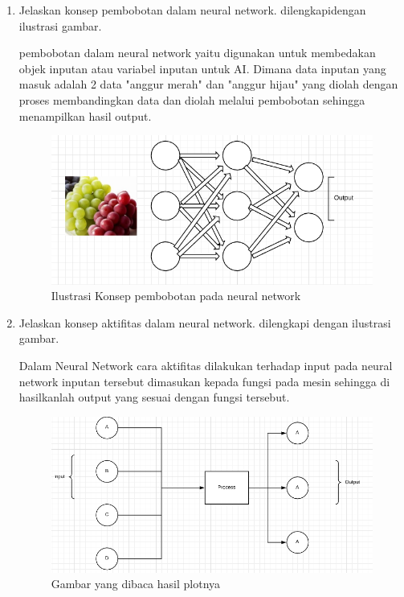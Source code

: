 \begin{enumerate}
\item Jelaskan konsep pembobotan  dalam neural network. dilengkapidengan ilustrasi gambar. \par
pembobotan dalam neural network yaitu digunakan untuk membedakan objek inputan atau 
variabel inputan untuk AI. Dimana data inputan yang masuk adalah 2 data "anggur merah" dan "anggur hijau" 
yang diolah dengan proses membandingkan data dan diolah melalui pembobotan sehingga menampilkan hasil output.

\begin{figure}[ht]
\centering
\includegraphics[scale=0.3]{figures/1174002/chapter6/1,3.PNG}
\caption{Ilustrasi Konsep pembobotan pada neural network}
\label{contoh}
\end{figure}

\item Jelaskan konsep aktifitas dalam neural network. dilengkapi dengan ilustrasi gambar.\par
Dalam Neural Network cara aktifitas dilakukan terhadap input pada neural network inputan tersebut dimasukan kepada 
fungsi pada mesin sehingga di hasilkanlah output yang sesuai dengan fungsi tersebut.

\begin{figure}[ht]
\centering
\includegraphics[scale=0.3]{figures/1174002/chapter6/1,4.PNG}
\caption{Gambar yang dibaca hasil plotnya}
\label{contoh}
\end{figure}


\end{enumerate}
